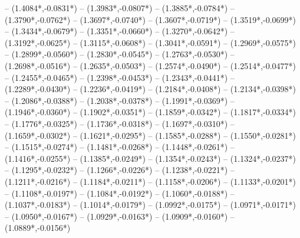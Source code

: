 {	-- ({1.4084*\dx},{-0.0831*\dy})
	-- ({1.3983*\dx},{-0.0807*\dy})
	-- ({1.3885*\dx},{-0.0784*\dy})
	-- ({1.3790*\dx},{-0.0762*\dy})
	-- ({1.3697*\dx},{-0.0740*\dy})
	-- ({1.3607*\dx},{-0.0719*\dy})
	-- ({1.3519*\dx},{-0.0699*\dy})
	-- ({1.3434*\dx},{-0.0679*\dy})
	-- ({1.3351*\dx},{-0.0660*\dy})
	-- ({1.3270*\dx},{-0.0642*\dy})
	-- ({1.3192*\dx},{-0.0625*\dy})
	-- ({1.3115*\dx},{-0.0608*\dy})
	-- ({1.3041*\dx},{-0.0591*\dy})
	-- ({1.2969*\dx},{-0.0575*\dy})
	-- ({1.2899*\dx},{-0.0560*\dy})
	-- ({1.2830*\dx},{-0.0545*\dy})
	-- ({1.2763*\dx},{-0.0530*\dy})
	-- ({1.2698*\dx},{-0.0516*\dy})
	-- ({1.2635*\dx},{-0.0503*\dy})
	-- ({1.2574*\dx},{-0.0490*\dy})
	-- ({1.2514*\dx},{-0.0477*\dy})
	-- ({1.2455*\dx},{-0.0465*\dy})
	-- ({1.2398*\dx},{-0.0453*\dy})
	-- ({1.2343*\dx},{-0.0441*\dy})
	-- ({1.2289*\dx},{-0.0430*\dy})
	-- ({1.2236*\dx},{-0.0419*\dy})
	-- ({1.2184*\dx},{-0.0408*\dy})
	-- ({1.2134*\dx},{-0.0398*\dy})
	-- ({1.2086*\dx},{-0.0388*\dy})
	-- ({1.2038*\dx},{-0.0378*\dy})
	-- ({1.1991*\dx},{-0.0369*\dy})
	-- ({1.1946*\dx},{-0.0360*\dy})
	-- ({1.1902*\dx},{-0.0351*\dy})
	-- ({1.1859*\dx},{-0.0342*\dy})
	-- ({1.1817*\dx},{-0.0334*\dy})
	-- ({1.1776*\dx},{-0.0325*\dy})
	-- ({1.1736*\dx},{-0.0318*\dy})
	-- ({1.1697*\dx},{-0.0310*\dy})
	-- ({1.1659*\dx},{-0.0302*\dy})
	-- ({1.1621*\dx},{-0.0295*\dy})
	-- ({1.1585*\dx},{-0.0288*\dy})
	-- ({1.1550*\dx},{-0.0281*\dy})
	-- ({1.1515*\dx},{-0.0274*\dy})
	-- ({1.1481*\dx},{-0.0268*\dy})
	-- ({1.1448*\dx},{-0.0261*\dy})
	-- ({1.1416*\dx},{-0.0255*\dy})
	-- ({1.1385*\dx},{-0.0249*\dy})
	-- ({1.1354*\dx},{-0.0243*\dy})
	-- ({1.1324*\dx},{-0.0237*\dy})
	-- ({1.1295*\dx},{-0.0232*\dy})
	-- ({1.1266*\dx},{-0.0226*\dy})
	-- ({1.1238*\dx},{-0.0221*\dy})
	-- ({1.1211*\dx},{-0.0216*\dy})
	-- ({1.1184*\dx},{-0.0211*\dy})
	-- ({1.1158*\dx},{-0.0206*\dy})
	-- ({1.1133*\dx},{-0.0201*\dy})
	-- ({1.1108*\dx},{-0.0197*\dy})
	-- ({1.1084*\dx},{-0.0192*\dy})
	-- ({1.1060*\dx},{-0.0188*\dy})
	-- ({1.1037*\dx},{-0.0183*\dy})
	-- ({1.1014*\dx},{-0.0179*\dy})
	-- ({1.0992*\dx},{-0.0175*\dy})
	-- ({1.0971*\dx},{-0.0171*\dy})
	-- ({1.0950*\dx},{-0.0167*\dy})
	-- ({1.0929*\dx},{-0.0163*\dy})
	-- ({1.0909*\dx},{-0.0160*\dy})
	-- ({1.0889*\dx},{-0.0156*\dy})
}
